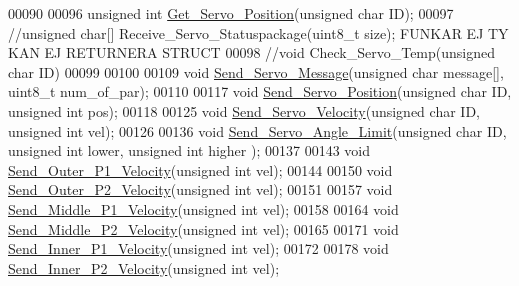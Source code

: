 \begin{DoxyCode}
00090 
00096 \textcolor{keywordtype}{unsigned} \textcolor{keywordtype}{int} \hyperlink{servo___u_a_r_t_8h_a70031bcf598a9d8568d8e344d9fc170b}{Get\_Servo\_Position}(\textcolor{keywordtype}{unsigned} \textcolor{keywordtype}{char} ID);
00097 \textcolor{comment}{//unsigned char[] Receive\_Servo\_Statuspackage(uint8\_t size); FUNKAR EJ TY KAN EJ RETURNERA STRUCT}
00098 \textcolor{comment}{//void Check\_Servo\_Temp(unsigned char ID)}
00099 
00100 
00109 \textcolor{keywordtype}{void} \hyperlink{servo___u_a_r_t_8h_a2ed3a2903977a774d1b174665d50661c}{Send\_Servo\_Message}(\textcolor{keywordtype}{unsigned} \textcolor{keywordtype}{char} message[], uint8\_t num\_of\_par);
00110 
00117 \textcolor{keywordtype}{void} \hyperlink{servo___u_a_r_t_8h_a5ed0e49737d1eaf80665c285396b4337}{Send\_Servo\_Position}(\textcolor{keywordtype}{unsigned} \textcolor{keywordtype}{char} ID, \textcolor{keywordtype}{unsigned} \textcolor{keywordtype}{int} pos);
00118 
00125 \textcolor{keywordtype}{void} \hyperlink{servo___u_a_r_t_8h_ac325c1636bc0a1c5b6cbe967bca0a6d2}{Send\_Servo\_Velocity}(\textcolor{keywordtype}{unsigned} \textcolor{keywordtype}{char} ID, \textcolor{keywordtype}{unsigned} \textcolor{keywordtype}{int} vel);
00126 
00136 \textcolor{keywordtype}{void} \hyperlink{servo___u_a_r_t_8h_aae1b10368951b07e7049392da8e8160b}{Send\_Servo\_Angle\_Limit}(\textcolor{keywordtype}{unsigned} \textcolor{keywordtype}{char} ID, \textcolor{keywordtype}{unsigned} \textcolor{keywordtype}{int} lower, \textcolor{keywordtype}{unsigned} \textcolor{keywordtype}{int} higher
      );
00137 
00143 \textcolor{keywordtype}{void} \hyperlink{servo___u_a_r_t_8h_a30fbb081db7418d454bfe8761ca59dd2}{Send\_Outer\_P1\_Velocity}(\textcolor{keywordtype}{unsigned} \textcolor{keywordtype}{int} vel); 
00144 
00150 \textcolor{keywordtype}{void} \hyperlink{servo___u_a_r_t_8h_a6c4f4c2915df647ac40c86c17e613e30}{Send\_Outer\_P2\_Velocity}(\textcolor{keywordtype}{unsigned} \textcolor{keywordtype}{int} vel); 
00151 
00157 \textcolor{keywordtype}{void} \hyperlink{servo___u_a_r_t_8h_a63e528b1a0c31e9912ebbceee58a5faa}{Send\_Middle\_P1\_Velocity}(\textcolor{keywordtype}{unsigned} \textcolor{keywordtype}{int} vel); 
00158 
00164 \textcolor{keywordtype}{void} \hyperlink{servo___u_a_r_t_8h_aae94fcd8998679345fa7d70648bd2a1e}{Send\_Middle\_P2\_Velocity}(\textcolor{keywordtype}{unsigned} \textcolor{keywordtype}{int} vel); 
00165 
00171 \textcolor{keywordtype}{void} \hyperlink{servo___u_a_r_t_8h_ace1792c5f066181d607cb075a87f3178}{Send\_Inner\_P1\_Velocity}(\textcolor{keywordtype}{unsigned} \textcolor{keywordtype}{int} vel); 
00172 
00178 \textcolor{keywordtype}{void} \hyperlink{servo___u_a_r_t_8h_a9cb7e763d9a3501fc345a424d67975a7}{Send\_Inner\_P2\_Velocity}(\textcolor{keywordtype}{unsigned} \textcolor{keywordtype}{int} vel); 

\end{DoxyCode}
